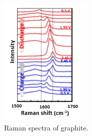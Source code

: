 \begin{figure}[tbh!]
\centering
\includegraphics[width=\textwidth]{Figures/chap2fig/Raman2}
\caption{Raman spectra of graphite.}
\label{Figures/chap2fig:Raman2}
\end{figure}

